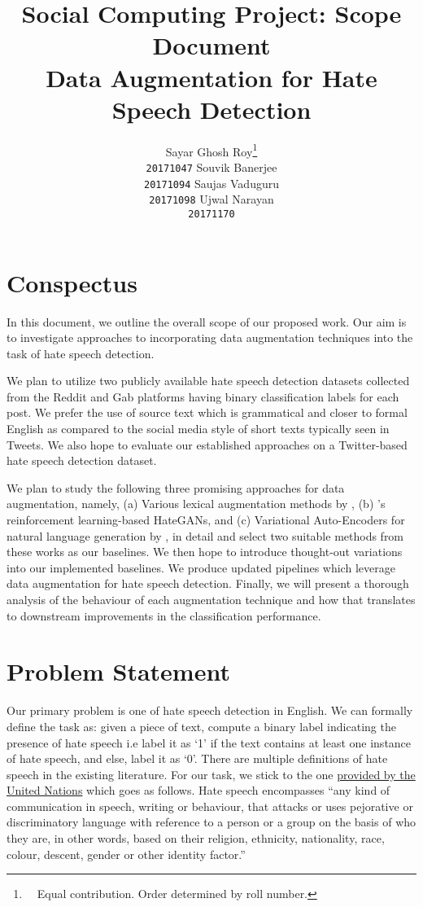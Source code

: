 \documentclass[11pt,a4paper]{article}
\title{{\normalsize Social Computing Project: Scope Document} \vspace{0.15cm} \\ Data Augmentation for Hate Speech Detection}
\author{Sayar Ghosh Roy\thanks{\ \ Equal contribution. Order determined by roll number.} \\ \texttt{20171047} \And
        Souvik Banerjee\footnotemark[1] \\ \texttt{20171094} \And
        Saujas Vaduguru\footnotemark[1] \\ \texttt{20171098} \And
        Ujwal Narayan\footnotemark[1] \\ \texttt{20171170}}
\date{}
\begin{document}
\maketitle

\section{Conspectus}
\justifying
\noindent
In this document, we outline the overall scope of our proposed work. Our aim is to investigate approaches to incorporating data augmentation techniques into the task of hate speech detection. 

We plan to utilize two publicly available hate speech detection datasets collected from the Reddit and Gab platforms \cite{benchmark} having binary classification labels for each post. We prefer the use of source text which is grammatical and closer to formal English as compared to the social media style of short texts typically seen in Tweets. We also hope to evaluate our established approaches on a Twitter-based hate speech detection dataset. 

We plan to study the following three promising approaches for data augmentation, namely, (a) Various lexical augmentation methods by \citet{aug2prev}, (b) \citet{cao-lee-2020-hategan}'s reinforcement learning-based HateGANs, and (c) Variational Auto-Encoders for natural language generation by \citet{bowman-etal-2016-generating}, in detail and select two suitable methods from these works as our baselines. We then hope to introduce thought-out variations into our implemented baselines. We produce updated pipelines which leverage data augmentation for hate speech detection. Finally, we will present a thorough analysis of the behaviour of each augmentation technique and how that translates to downstream improvements in the classification performance.

\section{Problem Statement}
Our primary problem is one of hate speech detection in English. We can formally define the task as: given a piece of text, compute a binary label indicating the presence of hate speech i.e label it as `1' if the text contains at least one instance of hate speech, and else, label it as `0'. There are multiple definitions of hate speech in the existing literature. For our task, we stick to the one \href{https://www.un.org/en/genocideprevention/documents/UN Strategy and Plan of Action on Hate Speech 18 June SYNOPSIS.pdf}{provided by the United Nations} which goes as follows. Hate speech encompasses ``any kind of communication in speech, writing or behaviour, that attacks or uses pejorative or discriminatory language with reference to a person or a group on the basis of who they are, in other words, based on their religion, ethnicity, nationality, race, colour, descent, gender or other identity factor.''
\end{document}
